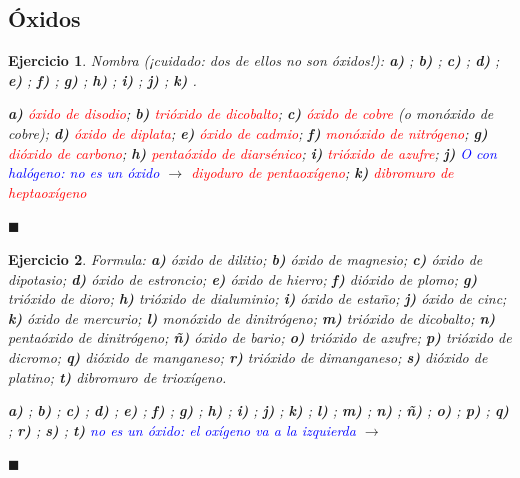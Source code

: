 \documentclass[12pt]{article}
\theoremstyle{mygreennumbox}
\newtheorem{ejercicioT}{Ejercicio}[section]
\newenvironment{exercise}{\begin{eBoxmygreen}\begin{ejercicioT}}{\hfill{\color{mygreen}\tiny\ensuremath{\blacksquare}}\end{ejercicioT}\end{eBoxmygreen}}
\begin{document}
\subsection{Óxidos}

\begin{exercise}
    Nombra (¡cuidado: dos de ellos no son óxidos!): \textbf{a)} ; \textbf{b)} ; \textbf{c)} ; \textbf{d)} ; \textbf{e)} ; \textbf{f)} ; \textbf{g)} ; \textbf{h)} ; \textbf{i)} ; \textbf{j)} ; \textbf{k)} .
    \begin{solu}
        \textbf{a)} \textcolor{red}{óxido de disodio}; \textbf{b)} \textcolor{red}{trióxido de dicobalto}; \textbf{c)} \textcolor{red}{óxido de cobre} (o monóxido de cobre); \textbf{d)} \textcolor{red}{óxido de diplata}; \textbf{e)} \textcolor{red}{óxido de cadmio}; \textbf{f)} \textcolor{red}{monóxido de nitrógeno}; \textbf{g)} \textcolor{red}{dióxido de carbono}; \textbf{h)} \textcolor{red}{pentaóxido de diarsénico}; \textbf{i)} \textcolor{red}{trióxido de azufre}; \textbf{j)} \textcolor{blue}{O con halógeno: no es un óxido} \(\to\) \textcolor{red}{diyoduro de pentaoxígeno}; \textbf{k)} \textcolor{red}{dibromuro de heptaoxígeno}
    \end{solu}
\end{exercise}

\begin{exercise}
    Formula: \textbf{a)} óxido de dilitio; \textbf{b)} óxido de magnesio; \textbf{c)} óxido de dipotasio; \textbf{d)} óxido de estroncio; \textbf{e)} óxido de hierro; \textbf{f)} dióxido de plomo; \textbf{g)} trióxido de dioro; \textbf{h)} trióxido de dialuminio; \textbf{i)} óxido de estaño; \textbf{j)} óxido de cinc; \textbf{k)} óxido de mercurio; \textbf{l)} monóxido de dinitrógeno; \textbf{m)} trióxido de dicobalto; \textbf{n)} pentaóxido de dinitrógeno; \textbf{ñ)} óxido de bario; \textbf{o)} trióxido de azufre; \textbf{p)} trióxido de dicromo; \textbf{q)} dióxido de manganeso; \textbf{r)} trióxido de dimanganeso; \textbf{s)} dióxido de platino; \textbf{t)} dibromuro de trioxígeno.
    \begin{solu}
        \textbf{a)} \textcolor{red}{}; \textbf{b)} \textcolor{red}{}; \textbf{c)} \textcolor{red}{}; \textbf{d)} \textcolor{red}{}; \textbf{e)} \textcolor{red}{}; \textbf{f)} \textcolor{red}{}; \textbf{g)} \textcolor{red}{}; \textbf{h)} \textcolor{red}{}; \textbf{i)} \textcolor{red}{}; \textbf{j)} \textcolor{red}{}; \textbf{k)} \textcolor{red}{}; \textbf{l)} \textcolor{red}{}; \textbf{m)} \textcolor{red}{}; \textbf{n)} \textcolor{red}{}; \textbf{ñ)} \textcolor{red}{}; \textbf{o)} \textcolor{red}{}; \textbf{p)} \textcolor{red}{}; \textbf{q)} \textcolor{red}{}; \textbf{r)} \textcolor{red}{}; \textbf{s)} \textcolor{red}{}; \textbf{t)} \textcolor{blue}{no es un óxido: el oxígeno va a la izquierda} \(\to\) \textcolor{red}{}
    \end{solu}
\end{exercise}
\end{document}
